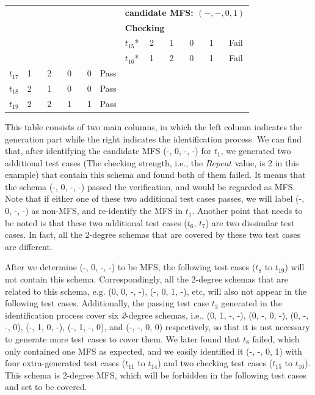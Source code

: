 \documentclass[10pt,journal,compsoc]{IEEEtran}
\begin{document}
\begin{table}[ht]
\begin{tabular}{llllll|llllll}
\multicolumn{5}{l}{}& &\multicolumn{6}{l}{ \bfseries{candidate MFS}: $(-, -, 0, 1)$ }  \\
\multicolumn{5}{l}{}& &\multicolumn{6}{l}{ \bfseries{\textbf{Checking}} }  \\
\multicolumn{5}{l}{}& & $t_{15}$* &\multicolumn{4}{l}{2  \ \ \  1 \ \ \  0 \ \ \  1 }& Fail \\
\multicolumn{5}{l}{}& & $t_{16}$* &\multicolumn{4}{l}{1  \ \ \  2 \ \ \  0 \ \ \  1 }& Fail \\
$t_{17}$ &\multicolumn{4}{l}{1  \ \ \  2 \ \ \ 0 \ \ \ 0 } & Pass & \multicolumn{6}{l}{}\\
$t_{18}$ &\multicolumn{4}{l}{2  \ \ \   1 \ \ \ 0  \ \ \  0 } & Pass & \multicolumn{6}{l}{}\\
$t_{19}$ &\multicolumn{4}{l}{2  \ \ \   2 \ \ \ 1  \ \ \  1 } & Pass & \multicolumn{6}{l}{}\\
\hline
\end{tabular}
\end{table}

This table consists of two main columns, in which the left column indicates the generation part while the right indicates the identification process. We can find that, after identifying the candidate MFS (-, 0, -, -) for $t_{1}$, we generated two additional test cases (The checking strength, i.e., the $Repeat$ value, is 2 in this example) that contain this schema and found both of them failed. It means that the schema (-, 0, -, -) passed the verification, and would be regarded as MFS. Note that if either one of these two additional test cases passes, we will label (-, 0, -, -) as non-MFS, and re-identify the MFS in $t_{1}$.  Another point that needs to be noted is that these two additional test cases ($t_{6}$, $t_{7}$) are two dissimilar test cases. In fact, all the 2-degree schemas that are covered by these two test cases are different.


After we determine (-, 0, -, -) to be MFS, the following test cases ($t_{8}$ to $t_{19}$) will not contain this schema. Correspondingly, all the 2-degree schemas that are related to this schema, e.g. (0, 0, -, -), (-, 0, 1, -), etc, will also not appear in the following test cases. Additionally, the passing test case $t_{3}$ generated in the identification process cover six \emph{2}-degree schemas, i.e., (0, 1, -, -), (0, -, 0, -), (0, -, -, 0), (-, 1, 0, -), (-, 1, -, 0), and (-, -, 0, 0) respectively, so that it is not necessary to generate more test cases to cover them. We later found that $t_{8}$ failed, which only contained one MFS as expected, and we easily identified it (-, -, 0, 1) with four extra-generated test cases ($t_{11}$ to $t_{14}$) and two checking test cases ($t_{15}$ to $t_{16}$). This schema is 2-degree MFS, which will be forbidden in the following test cases and set to be covered.
\end{document}
